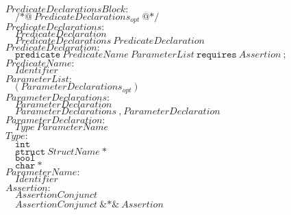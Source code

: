\documentclass{article}
\begin{document}
\begin{flushleft}
$\mathit{PredicateDeclarationsBlock{:}}$\\
$\quad \texttt{/*@}\ \mathit{PredicateDeclarations}_\mathit{opt}\ \texttt{@*/}$\\[5pt]

$\mathit{PredicateDeclarations{:}}$\\
$\quad \mathit{PredicateDeclaration}$\\
$\quad \mathit{PredicateDeclarations}\ \mathit{PredicateDeclaration}$\\[5pt]

$\mathit{PredicateDeclaration{:}}$\\
$\quad \texttt{predicate}\ \mathit{PredicateName}\ \mathit{ParameterList}\ \texttt{requires}\ \mathit{Assertion}\ \texttt{;}$\\[5pt]

$\mathit{PredicateName{:}}$\\
$\quad \mathit{Identifier}$\\[5pt]

$\mathit{ParameterList{:}}$\\
$\quad \texttt{(}\ \mathit{ParameterDeclarations}_\mathit{opt}\ \texttt{)}$\\[5pt]

$\mathit{ParameterDeclarations{:}}$\\
$\quad \mathit{ParameterDeclaration}$\\
$\quad \mathit{ParameterDeclarations}\ \texttt{,}\ \mathit{ParameterDeclaration}$\\[5pt]

$\mathit{ParameterDeclaration{:}}$\\
$\quad \mathit{Type}\ \mathit{ParameterName}$\\[5pt]

$\mathit{Type{:}}$\\
$\quad \mathtt{int}$\\
$\quad \mathtt{struct}\ \mathit{StructName}\ \texttt{*}$\\
$\quad \mathtt{bool}$\\
$\quad \mathtt{char}\ \texttt{*}$\\[5pt]

$\mathit{ParameterName{:}}$\\
$\quad \mathit{Identifier}$\\[5pt]

$\mathit{Assertion{:}}$\\
$\quad \mathit{AssertionConjunct}$\\
$\quad \mathit{AssertionConjunct}\ \texttt{\&*\&}\ \mathit{Assertion}$\\[5pt]


\end{flushleft}
\end{document}
